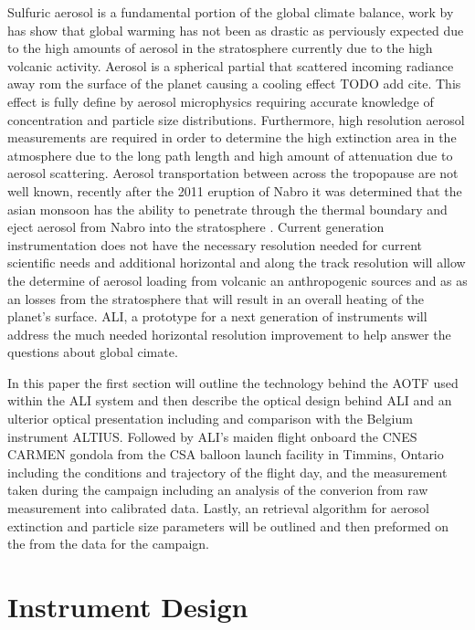 \documentclass[12pt]{article}
\begin{document}
Sulfuric aerosol is a fundamental portion of the global climate balance, work by \cite{TODO nature paper abou aerosl loading} has show that global warming has not been as drastic as perviously expected due to the high amounts of aerosol in the stratosphere currently due to the high volcanic activity. Aerosol is a spherical partial that scattered incoming radiance away rom the surface of the planet causing a cooling effect TODO add cite. This effect is fully define by aerosol microphysics requiring accurate knowledge of concentration and particle size distributions. Furthermore, high resolution aerosol measurements are required in order to determine the high extinction area in the atmosphere due to the long path length and high amount of attenuation due to aerosol scattering. Aerosol transportation between across the tropopause are not well known, recently after the 2011 eruption of Nabro it was determined that the asian monsoon has the ability to penetrate through the thermal boundary and eject aerosol from Nabro into the stratosphere \citep{TODO:add Adams nature paper}. Current generation instrumentation does not have the necessary resolution needed for current scientific needs and additional horizontal and along the track resolution will allow the determine of aerosol loading from volcanic an anthropogenic sources and as as an losses from the stratosphere that will result in an overall heating of the planet's surface. ALI, a prototype for a next generation of instruments will address the much needed horizontal resolution improvement to help answer the questions about global cimate.

In this paper the first section will outline the technology behind the AOTF used within the ALI system and then describe the optical design behind ALI and an ulterior optical presentation including and comparison with the Belgium instrument ALTIUS. Followed by ALI's maiden flight onboard the CNES CARMEN gondola from the CSA balloon launch facility in Timmins, Ontario including the conditions and trajectory of the flight day, and the measurement taken during the campaign including an analysis of the converion from raw measurement into calibrated data. Lastly, an retrieval algorithm for aerosol extinction and particle size parameters will be outlined and then preformed on the from the data for the campaign.

\section{Instrument Design}
\end{document}
